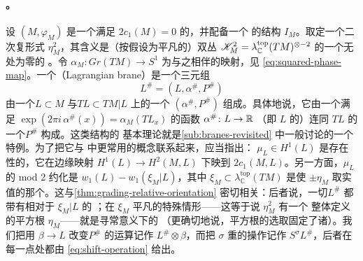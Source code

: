 \paragraph{\trLagrange\trBrane。}\label{sub:lagrangian-branes}
设 $(M,\varphi_M)$ 是一个满足 $2c_1(M)=0$ 的\trSymplectic\trManifold，并配备一个%
\trCompatible{}的\trAlmostComplex{}结构 $I_M$。取定一个二次复\trVolume{}形式
$\eta_M^2$，其含义是（按假设为平凡的）双\trCanonical{}丛
$\mathscr{K}_M^2=\lambda_{\mathbb{C}}^{\mathrm{top}}(TM)^{\otimes-2}$ 的一个无处为零的%
\trSection。令 $\alpha_M\colon Gr(TM)\to S^1$ 为与之相伴的\trSquaredPhase{}映射，见
\eqref{eq:squared-phase-map}。一个\textbf{\trLagrange\trBrane}（Lagrangian
brane）是一个三元组
\begin{equation*}
L^{\#}=(L,\alpha^{\#},P^{\#})
\end{equation*}
由一个\trLagrange\trSubmanifold{}$L\subset M$ 与\trSubbundle{}$TL\subset TM|L$ 上的一个%
\trBraneStructure{}$(\alpha^{\#},P^{\#})$ 组成。具体地说，它由一个满足
$\exp(2\pi i\,\alpha^{\#}(x))=\alpha_M(TL_x)$ 的函数 $\alpha^{\#}\colon L\to\mathbb{R}$
（即 $L$ 的\trGrading）连同 $TL$ 的一个\trPinStructure{}$P^{\#}$ 构成。这类结构的
基本理论就是\cref{sub:branes-revisited} 中一般讨论的一个特例。为了把它与%
\trSymplectic\trTopology{}中更常用的概念联系起来，应当指出：\trMaslovClass{}
$\mu_L\in H^1(L)$ 是\trGrading{}存在性的\trObstruction，它在边缘映射
$H^1(L)\to H^2(M,L)$ 下映到%
\trRelative\trFirstChernClass{}$2c_1(M,L)$。另一方面，$\mu_L$ 的 mod 2 约化是
$w_1(L)-w_1(\xi_M|L)$，其中 $\xi_M\subset\lambda_{\mathbb{C}}^{\mathrm{top}}(TM)$
是使 $\pm\eta_M$ 取实值的那个\trRealLineBundle。这与\cref{thm:grading-relative-orientation}
密切相关：后者说，一切\trLagrange\trBrane{}$L^{\#}$ 都带有相对于 $\xi_M|L$ 的%
\trCanonical\trOrientation；在 $\xi_M$ 平凡的特殊情形——这等于说 $\eta_M^2$ 有一个
整体定义的平方根 $\eta_M$——\trLagrange\trBrane{}就是寻常意义下\trOrientation{}的
（更确切地说，平方根的选取固定了诸\trOrientation）。我们把用\trRealLineBundle{}
$\beta\to L$ 改变\trPinStructure{}$P^{\#}$ 的运算记作 $L^{\#}\otimes\beta$，而把
$\sigma$ 重的\trSuspension{}操作记作 $S^\sigma L^{\#}$，后者在每一点处都由
\eqref{eq:shift-operation} 给出。
